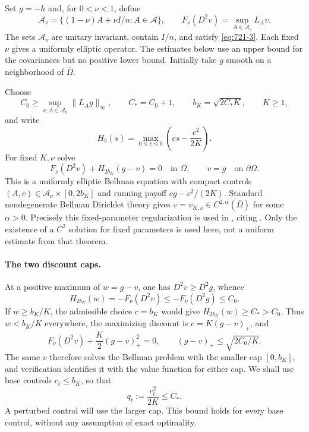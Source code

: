 \documentclass[11pt,a4paper]{article}
\theoremstyle{remark}
\begin{document}
Set $g=-h$ and, for $0<\nu<1$, define
\begin{equation}
 \mathcal A_\nu=\{(1-\nu)A+\nu I/n:A\in\mathcal A\},\qquad
 F_\nu(D^2v)=\sup_{A\in\mathcal A_\nu}L_Av.
 \label{eq:721-4}
\end{equation}
The sets $\mathcal A_\nu$ are unitary invariant, contain $I/n$, and satisfy
\eqref{eq:721-3}.  Each fixed $\nu$ gives a uniformly elliptic operator.  The estimates
below use an upper bound for the covariances but no positive lower bound.
Initially take $g$ smooth on a neighborhood of $\overline\Omega$.

Choose
\[
 C_0\ge\sup_{\nu,A\in\mathcal A_\nu}\|L_Ag\|_\infty,
 \qquad C_*=C_0+1,\qquad b_K=\sqrt{2C_*K},\qquad K\ge1,
\]
and write
\[
 H_b(s)=\max_{0\le c\le b}\left(cs-\frac{c^2}{2K}\right).
\]
For fixed $K,\nu$ solve
\begin{equation}
 F_\nu(D^2v)+H_{2b_K}(g-v)=0\quad\text{in }\Omega,
 \qquad v=g\quad\text{on }\partial\Omega.
 \label{eq:721-5}
\end{equation}
This is a uniformly elliptic Bellman equation with compact controls
$(A,c)\in\mathcal A_\nu\times[0,2b_K]$ and running payoff
$cg-c^2/(2K)$.  Standard nondegenerate Bellman Dirichlet theory gives
$v=v_{K,\nu}\in C^{2,\alpha}(\overline\Omega)$ for some $\alpha>0$.
Precisely this fixed-parameter regularization is used in
\cite[\S5, Remark 5.1]{ZhouBellman2015}, citing
\cite[\S6.2, Theorem 7]{Krylov1987}.  Only the existence of a $C^2$ solution
for fixed parameters is used here, not a uniform estimate from that theorem.

\paragraph{The two discount caps.}
At a positive maximum of $w=g-v$, one has $D^2v\ge D^2g$, whence
\[
 H_{2b_K}(w)=-F_\nu(D^2v)\le-F_\nu(D^2g)\le C_0.
\]
If $w\ge b_K/K$, the admissible choice $c=b_K$ would give
$H_{2b_K}(w)\ge C_*>C_0$.  Thus $w<b_K/K$ everywhere, the maximizing
discount is $c=K(g-v)_+$, and
\begin{equation}
 F_\nu(D^2v)+\frac K2(g-v)_+^2=0,
 \qquad (g-v)_+\le\sqrt{2C_0/K}.
 \label{eq:721-6}
\end{equation}
The same $v$ therefore solves the Bellman problem with the smaller cap
$[0,b_K]$, and verification identifies it with the value function for either
cap.  We shall use base controls $c_t\le b_K$, so that
\begin{equation}
 q_t:=\frac{c_t^2}{2K}\le C_*.
 \label{eq:721-7}
\end{equation}
A perturbed control will use the larger cap.  This bound holds for every base
control, without any assumption of exact optimality.
\end{document}
